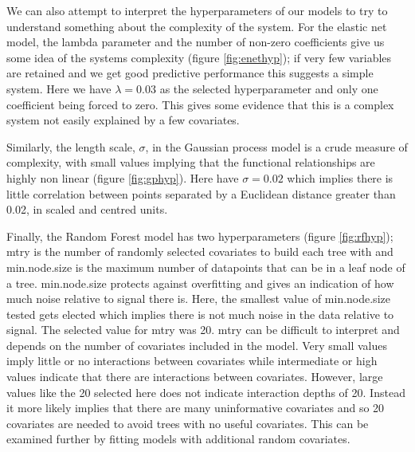 \documentclass[10pt,]{article}
\begin{document}


We can also attempt to interpret the hyperparameters of our models to try to understand something about the complexity of the system.
For the elastic net model, the lambda parameter and the number of non-zero coefficients give us some idea of the systems complexity (figure \ref{fig:enethyp}); if very few variables are retained and we get good predictive performance this suggests a simple system.
Here we have \(\lambda = 0.03\) as the selected hyperparameter and only one coefficient being forced to zero.
This gives some evidence that this is a complex system not easily explained by a few covariates.

Similarly, the length scale, \(\sigma\), in the Gaussian process model is a crude measure of complexity, with small values implying that the functional relationships are highly non linear (figure \ref{fig:gphyp}).
Here have \(\sigma = 0.02\) which implies there is little correlation between points separated by a Euclidean distance greater than 0.02, in scaled and centred units.

Finally, the Random Forest model has two hyperparameters (figure \ref{fig:rfhyp}); mtry is the number of randomly selected covariates to build each tree with and min.node.size is the maximum number of datapoints that can be in a leaf node of a tree.
min.node.size protects against overfitting and gives an indication of how much noise relative to signal there is.
Here, the smallest value of min.node.size tested gets elected which implies there is not much noise in the data relative to signal.
The selected value for mtry was 20.
mtry can be difficult to interpret and depends on the number of covariates included in the model.
Very small values imply little or no interactions between covariates while intermediate or high values indicate that there are interactions between covariates.
However, large values like the 20 selected here does not indicate interaction depths of 20.
Instead it more likely implies that there are many uninformative covariates and so 20 covariates are needed to avoid trees with no useful covariates.
This can be examined further by fitting models with additional random covariates.
\end{document}
